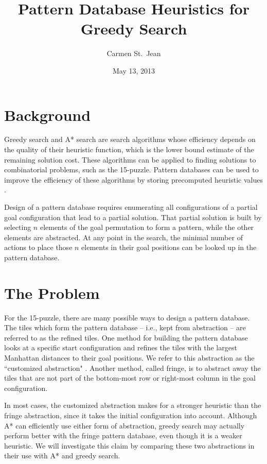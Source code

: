 \documentclass[letterpaper]{article}
\begin{document}
\title{Pattern Database Heuristics for Greedy Search}
\date{May 13, 2013}
\author{Carmen St.\ Jean}

\nocopyright{\gdef\copyright@on{}}

\maketitle

\section{Background}

Greedy search and A* search are search algorithms whose efficiency depends on the quality of their heuristic function, which is the lower bound estimate of the remaining solution cost.  These algorithms can be applied to finding solutions to combinatorial problems, such as the 15-puzzle.  Pattern databases can be used to improve the efficiency of these algorithms by storing precomputed heuristic values \cite{DBLP:journals/ci/CulbersonS98}.

Design of a pattern database requires enumerating all configurations of a partial goal configuration that lead to a partial solution.  That partial solution is built by selecting $n$ elements of the goal permutation to form a pattern, while the other elements are abstracted.  At any point in the search, the minimal number of actions to place those $n$ elements in their goal positions can be looked up in the pattern database.

\section{The Problem}

For the 15-puzzle, there are many possible ways to design a pattern database.  The tiles which form the pattern database -- i.e., kept from abstraction -- are referred to as the refined tiles.  One method for building the pattern database looks at a specific start configuration and refines the tiles with the largest Manhattan distances to their goal positions.  We refer to this abstraction as the ``customized abstraction" \cite{DBLP:conf/sara/HolteGT05}. Another method, called fringe, is to abstract away the tiles that are not part of the bottom-most row or right-most column in the goal configuration.

In most cases, the customized abstraction makes for a stronger heuristic than the fringe abstraction, since it takes the initial configuration into account.  Although A* can efficiently use either form of abstraction, greedy search may actually perform better with the fringe pattern database, even though it is a weaker heuristic.  We will investigate this claim by comparing these two abstractions in their use with A* and greedy search. 
\end{document}
